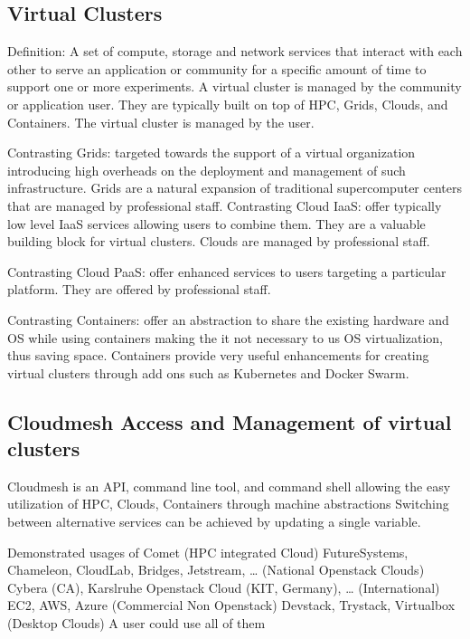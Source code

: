 \subsection{Virtual Clusters}

Definition: A set of compute, storage and network services that
interact with each other to serve an application or community for a
specific amount of time to support one or more experiments. A virtual
cluster is managed by the community or application user. They are
typically built on top of HPC, Grids, Clouds, and Containers. The
virtual cluster is managed by the user.

Contrasting Grids: targeted towards the support of a virtual
organization introducing high overheads on the deployment and
management of such infrastructure. Grids are a natural expansion of
traditional supercomputer centers that are managed by professional
staff. Contrasting Cloud IaaS: offer typically low level IaaS services
allowing users to combine them. They are a valuable building block for
virtual clusters. Clouds are managed by professional staff.

Contrasting Cloud PaaS: offer enhanced services to users targeting a
particular platform. They are offered by professional staff.

Contrasting Containers: offer an abstraction to share the existing hardware and OS while using containers making the it not necessary to us OS virtualization, thus saving space. Containers provide very useful enhancements for creating virtual clusters through add ons such as Kubernetes and Docker Swarm.



\subsection{Cloudmesh Access and Management of virtual clusters}
Cloudmesh is an API, command line tool, and command shell allowing the easy utilization of HPC, Clouds, Containers through machine abstractions
Switching between alternative services can be achieved by updating a
single variable.

Demonstrated usages of
Comet                                                                                           (HPC integrated Cloud)
FutureSystems, Chameleon, CloudLab, Bridges, Jetstream, …  (National Openstack Clouds)
Cybera (CA), Karslruhe Openstack Cloud (KIT, Germany), …     (International)
EC2, AWS, Azure                                                                          (Commercial Non Openstack)
Devstack, Trystack, Virtualbox                                                       (Desktop Clouds)
A user could use all of them

